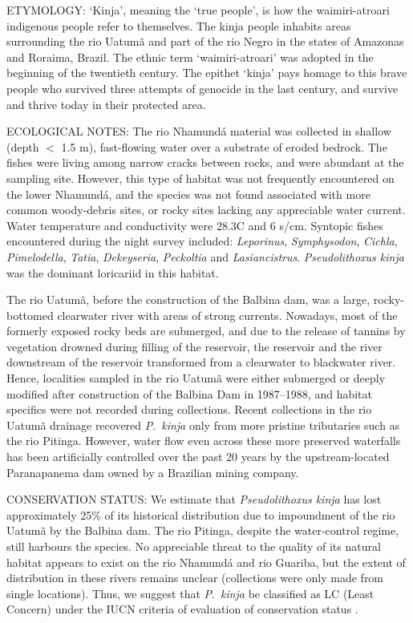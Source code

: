 \documentclass[12pt]{article}
\begin{document}
\noindent ETYMOLOGY: `Kinja', meaning the `true people', is how the waimiri-atroari indigenous people refer to themselves. %
The kinja people inhabits areas surrounding the rio Uatumã and part of the rio Negro in the states of Amazonas and Roraima, Brazil. %
The ethnic term `waimiri-atroari' was adopted in the beginning of the twentieth century. %
The epithet `kinja' pays homage to this brave people who survived three attempts of genocide in the last century, and survive and thrive today in their protected area.\\%
\bigskip

\noindent ECOLOGICAL NOTES: The rio Nhamundá material was collected in shallow (depth $<$ 1.5 m), fast-flowing water over a substrate of eroded bedrock. %
The fishes were living among narrow cracks between rocks, and were abundant at the sampling site. %
However, this type of habitat was not frequently encountered on the lower Nhamundá, and the species was not found associated with more common woody-debris sites, or rocky sites lacking any appreciable water current. %
Water temperature and conductivity were 28.3\degree C and 6 \micro s/cm. %
Syntopic fishes encountered during the night survey included: \emph{Leporinus}, \emph{Symphysodon}, \emph{Cichla}, \emph{Pimelodella}, \emph{Tatia}, \emph{Dekeyseria}, \emph{Peckoltia} and \emph{Lasiancistrus}. %
\emph{Pseudolithoxus kinja} was the dominant loricariid in this habitat.%

The rio Uatumã, before the construction of the Balbina dam, was a large, rocky-bottomed clearwater river with areas of strong currents. %
Nowadays, most of the formerly exposed rocky beds are submerged, and due to the release of tannins by vegetation drowned during filling of the reservoir, the reservoir and the river downstream of the reservoir transformed from a clearwater to blackwater river. %
Hence, localities sampled in the rio Uatumã were either submerged or deeply modified after construction of the Balbina Dam in 1987--1988, and habitat specifics were not recorded during collections. %
Recent collections in the rio Uatumã drainage recovered \emph{P}.\ \emph{kinja} only from more pristine tributaries such as the rio Pitinga. %
However, water flow even across these more preserved waterfalls has been artificially controlled over the past 20 years by the upstream-located Paranapanema dam owned by a Brazilian mining company.\\%
\bigskip

\noindent CONSERVATION STATUS: We estimate that \emph{Pseudolithoxus kinja} has lost approximately 25\% of its historical distribution due to impoundment of the rio Uatumã by the Balbina dam. %
The rio Pitinga, despite the water-control regime, still harbours the species. %
No appreciable threat to the quality of its natural habitat appears to exist on the rio Nhamundá and rio Guariba, but the extent of distribution in these rivers remains unclear (collections were only made from single locations). %
Thus, we suggest that \emph{P}.\ \emph{kinja} be classified as LC (Least Concern) under the IUCN criteria of evaluation of conservation status \citep{IUCN2012}.%
\end{document}
